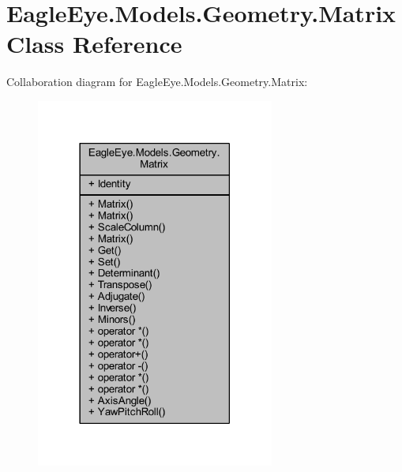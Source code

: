 \hypertarget{class_eagle_eye_1_1_models_1_1_geometry_1_1_matrix}{}\section{Eagle\+Eye.\+Models.\+Geometry.\+Matrix Class Reference}
\label{class_eagle_eye_1_1_models_1_1_geometry_1_1_matrix}


Collaboration diagram for Eagle\+Eye.\+Models.\+Geometry.\+Matrix\+:\nopagebreak
\begin{figure}[H]
\begin{center}
\leavevmode
\includegraphics[width=222pt]{class_eagle_eye_1_1_models_1_1_geometry_1_1_matrix__coll__graph}
\end{center}
\end{figure}
